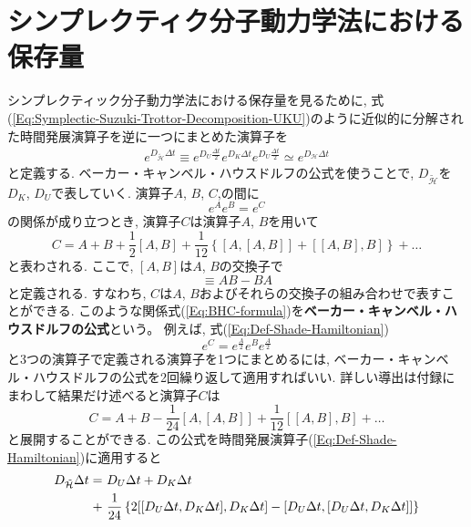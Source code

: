 \section{シンプレクティク分子動力学法における保存量}
シンプレクティック分子動力学法における保存量を見るために, 式(\ref{Eq:Symplectic-Suzuki-Trottor-Decomposition-UKU})のように近似的に分解された時間発展演算子を逆に一つにまとめた演算子を
\begin{align}
  e^{D_{\tilde{\mathcal{H}}} \Delta t}
  \equiv
  e^{D_{U} \frac{\Delta t}{2}}
  e^{D_{K} \Delta t}
  e^{D_{U} \frac{\Delta t}{2}}
  \simeq
  e^{D_{\mathcal{H}} \Delta t}
  \label{Eq:Def-Shade-Hamiltonian}
\end{align}
と定義する.
ベーカー・キャンベル・ハウスドルフの公式を使うことで, $D_{\tilde{\mathcal{H}}}$を$D_{K}$, $D_{U}$で表していく.
演算子$A$, $B$, $C$,の間に
\begin{equation}
  e^{A}e^{B} = e^{C}
\end{equation}
の関係が成り立つとき, 演算子$C$は演算子$A$, $B$を用いて
\begin{equation}
  C = A + B
    + \frac{1}{2} [A, B]
    + \frac{1}{12}
      \left\{
        [A, [A,B]] + [[A,B], B]
      \right\}
    + \ldots
  \label{Eq:BHC-formula}
\end{equation}
と表わされる. ここで, $[A, B]$は$A$, $B$の交換子で
\begin{equation}
  [A, B] \equiv AB - BA
\end{equation}
と定義される. すなわち, $C$は$A$, $B$およびそれらの交換子の組み合わせで表すことができる. 
このような関係式(\ref{Eq:BHC-formula})を\textbf{ベーカー・キャンベル・ハウスドルフの公式}という。
例えば, 式(\ref{Eq:Def-Shade-Hamiltonian})
\begin{equation}
  e^{C} = e^{\frac{A}{2}}e^{B}e^{\frac{A}{2}}
  \label{Eq:BHCformula-3operator}
\end{equation}
と3つの演算子で定義される演算子を1つにまとめるには, ベーカー・キャンベル・ハウスドルフの公式を2回繰り返して適用すればいい. 詳しい導出は付録にまわして結果だけ述べると演算子$C$は
\begin{equation}
  C = A + B
    - \frac{1}{24}[A, [A,B]]
    + \frac{1}{12}[[A,B], B]
    + \ldots
  \label{Eq:BHCformula-3operator-expansion}
\end{equation}
と展開することができる.
この公式を時間発展演算子(\ref{Eq:Def-Shade-Hamiltonian})に適用すると
\begin{align}
  D_{\Tilde{\mathcal{H}}} \Delta t
  =~&
  D_{U} \Delta t + D_{K} \Delta t
  \\ \notag
  +~&
  \frac{1}{24}
  \left\{
      2[[D_{U}\Delta t, D_{K}\Delta t], D_{K} \Delta t]
    -  [D_{U}\Delta t, [D_{U}\Delta t, D_{K}\Delta t]]
  \right\}
  \notag
\end{align}
